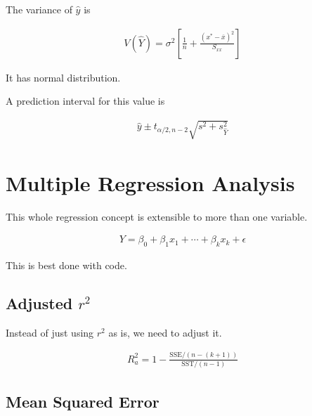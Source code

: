    The variance of $\hat{y}$ is

    \begin{equation*}
        \begin{aligned}
            V(\hat{Y}) = \sigma^2 \left[ \frac{1}{n} + \frac{{\left( x^* - \overline{x} \right)}^2}{S_{xx}} \right]
        \end{aligned}
    \end{equation*}

    It has normal distribution.

    A prediction interval for this value is

    \begin{equation*}
        \begin{aligned}
            \hat{y} \pm t_{\alpha / 2, n - 2} \sqrt{s^2 + s^2_{\hat{Y}}}
        \end{aligned}
    \end{equation*}

\section{Multiple Regression Analysis}
This whole regression concept is extensible to more than one variable.

\begin{equation*}
    \begin{aligned}
        Y = \beta_0 + \beta_1 x_1 + \cdots + \beta_k x_k + \epsilon
    \end{aligned}
\end{equation*}

This is best done with code.

    \subsection{Adjusted $r^2$}
    Instead of just using $r^2$ as is, we need to adjust it.

    \begin{equation*}
        \begin{aligned}
            R^2_a = 1 - \frac{\text{SSE} / (n - (k + 1))}{\text{SST} / (n - 1)}
        \end{aligned}
    \end{equation*}

    \subsection{Mean Squared Error}

